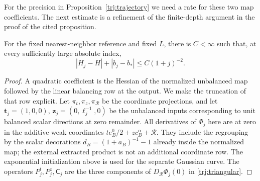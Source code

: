 For the precision in Proposition~\ref{trj:trajectory} we need a rate
for these two map coefficients.  The next estimate is a refinement
of the finite-depth argument in the proof of the cited proposition.

\begin{lemma}\label{trj:coefficient-rate}
For the fixed nearest-neighbor reference and fixed \(L\), there is
\(C<\infty\) such that, at every sufficiently large absolute index,
\begin{equation}\label{trj:coefficient-bound}
                 |H_j-H|+|b_j-b_*|\le C(1+j)^{-2}.
\end{equation}
\end{lemma}

\begin{proof}
A quadratic coefficient is the Hessian of the normalized unbalanced
map followed by the linear balancing row at the output.  We make the
truncation of that row explicit.  Let
\(\pi_t,\pi_z,\pi_{\mathcal R}\) be the coordinate projections, and let
\(\mathbf t_j=(1,0,0)\), \(\mathbf z_j=(0,\ell_j^{-1},0)\) be the
unbalanced inputs corresponding to unit balanced scalar directions at
zero remainder.  All derivatives of \(\Phi_j\) here are at zero in
the additive weak coordinates \(t e_B^0/2+z c_B^\alpha+\mathcal R\).
They include the regrouping by the scalar decorations
\(d_B=(1+a_B)^{-1}-1\) already inside the normalized map; the external
extracted product is not an additional
coordinate row.  The exponential initialization above is used for the
separate Gaussian curve.  The operators \(P_j^t,P_j^z,\mathsf C_j\)
are the three components of \(D_{\mathcal R}\Phi_j(0)\) in
\eqref{trj:triangular}.


\end{proof}

